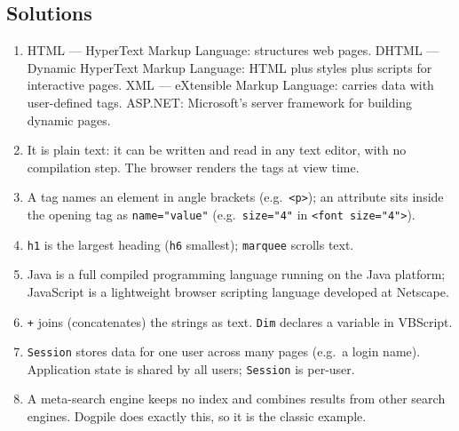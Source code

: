 \documentclass[11pt]{article}
\begin{document}
\subsection*{Solutions}
\begingroup\small
\begin{enumerate}[label=\arabic*.]
  \item HTML --- HyperText Markup Language: structures web pages. DHTML --- Dynamic HyperText Markup Language: HTML plus styles plus scripts for interactive pages. XML --- eXtensible Markup Language: carries data with user-defined tags. ASP.NET: Microsoft's server framework for building dynamic pages.
  \item It is plain text: it can be written and read in any text editor, with no compilation step. The browser renders the tags at view time.
  \item A tag names an element in angle brackets (e.g.\ \texttt{<p>}); an attribute sits inside the opening tag as \texttt{name="value"} (e.g.\ \texttt{size="4"} in \texttt{<font size="4">}).
  \item \texttt{h1} is the largest heading (\texttt{h6} smallest); \texttt{marquee} scrolls text.
  \item Java is a full compiled programming language running on the Java platform; JavaScript is a lightweight browser scripting language developed at Netscape.
  \item \texttt{+} joins (concatenates) the strings as text. \texttt{Dim} declares a variable in VBScript.
  \item \texttt{Session} stores data for one user across many pages (e.g.\ a login name). Application state is shared by all users; \texttt{Session} is per-user.
  \item A meta-search engine keeps no index and combines results from other search engines. Dogpile does exactly this, so it is the classic example.
\end{enumerate}
\endgroup
\end{document}
